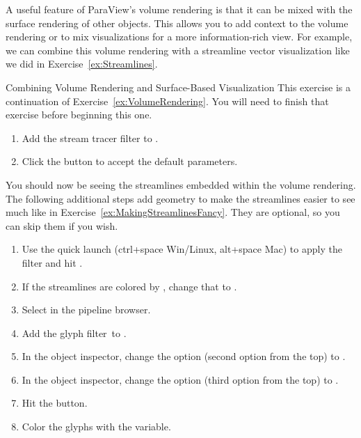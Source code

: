 A useful feature of ParaView’s volume rendering is that it can be mixed
with the surface rendering of other objects.  This allows you to add
context to the volume rendering or to mix visualizations for a more
information-rich view.  For example, we can combine this volume rendering
with a streamline vector visualization like we did in
Exercise~\ref{ex:Streamlines}.

\begin{exercise}{Combining Volume Rendering and Surface-Based Visualization}
  \label{ex:CombiningVolumeAndSurfaceRendering}%
  This exercise is a continuation of Exercise~\ref{ex:VolumeRendering}.
  You will need to finish that exercise before beginning this one.

  \begin{enumerate}
  \item Add the stream tracer filter \streamTracer to
    .
  \item Click the \apply button to accept the default parameters.
    \savecounter
  \end{enumerate}

  You should now be seeing the streamlines embedded within the volume
  rendering.  The following additional steps add geometry to make the
  streamlines easier to see much like in
  Exercise~\ref{ex:MakingStreamlinesFancy}.  They are optional, so you can
  skip them if you wish.

  \begin{enumerate}
    \restorecounter
  \item Use the quick launch (ctrl+space Win/Linux, alt+space Mac) to apply
    the  filter and hit \apply.
  \item If the streamlines are colored by , change that to
    .
  \item Select  in the pipeline browser.
  \item Add the glyph filter~\glyph to .
  \item In the object inspector, change the  option (second
    option from the top) to .
  \item In the object inspector, change the  option (third
    option from the top) to .
  \item Hit the \apply button.
  \item Color the glyphs with the  variable.
  \end{enumerate}


\end{exercise}
